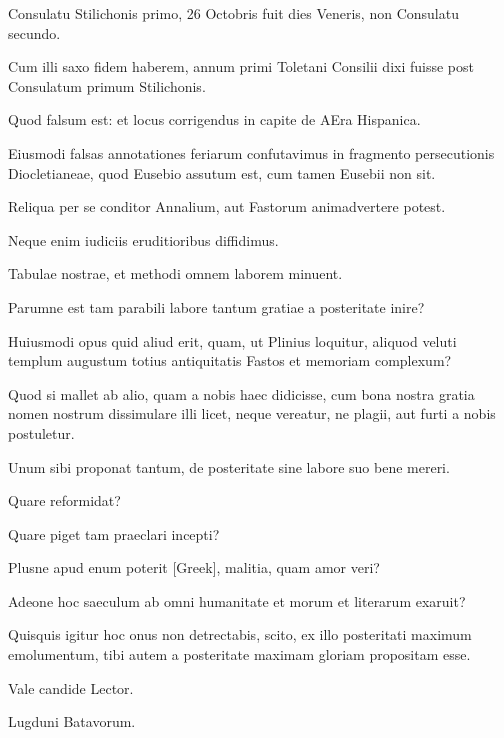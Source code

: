 \begin{parnumbers}
Consulatu Stilichonis primo, 26 Octobris fuit dies Veneris,
non Consulatu secundo.

Cum illi saxo fidem haberem, annum primi
Toletani Consilii dixi fuisse post Consulatum primum Stilichonis.

Quod falsum est: et locus corrigendus in capite de AEra Hispanica.

Eiusmodi falsas annotationes feriarum confutavimus in fragmento
persecutionis Diocletianeae, quod Eusebio assutum est, cum tamen
Eusebii non sit.

Reliqua per se conditor Annalium, aut Fastorum animadvertere
potest.

Neque enim iudiciis eruditioribus diffidimus.

Tabulae nostrae, et methodi omnem laborem minuent.

Parumne est
tam parabili labore tantum gratiae a posteritate inire?

Huiusmodi
opus quid aliud erit, quam, ut Plinius loquitur, aliquod veluti templum
augustum totius antiquitatis Fastos et memoriam complexum?

Quod si mallet ab alio, quam a nobis haec didicisse, cum bona nostra
gratia nomen nostrum dissimulare illi licet, neque vereatur, ne
plagii, aut furti a nobis postuletur.

Unum sibi proponat tantum, de
posteritate sine labore suo bene mereri.

Quare reformidat?

Quare piget tam praeclari incepti?

Plusne apud enum poterit \textgreek{[Greek]}, malitia,
quam amor veri?

Adeone hoc saeculum ab omni humanitate et
morum et literarum exaruit?

Quisquis igitur hoc onus non detrectabis,
scito, ex illo posteritati maximum emolumentum, tibi autem
a posteritate maximam gloriam propositam esse.

Vale candide
Lector.

Lugduni Batavorum.

\end{parnumbers}
